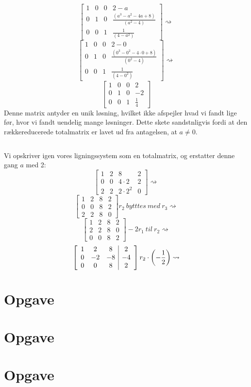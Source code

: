 \documentclass[a4paper,12pt]{article}
\begin{document}
\[
\left[\begin{array}{ccc|c}
    1 & 0 & 0 & 2-a \\
    0 & 1 & 0 & \frac{(a^3 - a^2 - 4a + 8)}{(a^2 - 4)} \\
    0 & 0 & 1 & \frac{1}{(4-a^2)}
\end{array}\right]
\rightsquigarrow
\]
\[
\left[\begin{array}{ccc|c}
    1 & 0 & 0 & 2-0 \\
    0 & 1 & 0 & \frac{(0^3 - 0^2 - 4\cdot0 + 8)}{(0^2 - 4)} \\
    0 & 0 & 1 & \frac{1}{(4-0^2)}
\end{array}\right]
\rightsquigarrow
\]
\[
\left[\begin{array}{ccc|c}
    1 & 0 & 0 & 2 \\
    0 & 1 & 0 & -2 \\
    0 & 0 & 1 & \frac{1}{4}
\end{array}\right]
\]
Denne matrix antyder en unik løsning, hvilket ikke afspejler hvad vi fandt lige før, hvor vi fandt uendelig mange løsninger. Dette skete sandstnligvis fordi at den rækkereducerede totalmatrix er lavet ud fra antagelsen, at $a \neq 0$.

\subsection{}
Vi opskriver igen vores ligningssystem som en totalmatrix, og erstatter denne gang $a$ med 2:
\[
\left[\begin{array}{ccc|c}
    1 & 2 & 8 & 2 \\
    0 & 0 & 4\cdot2 & 2 \\
    2 & 2 & 2\cdot2^2 & 0
\end{array}\right]
\rightsquigarrow
\]
\[
\left[\begin{array}{ccc|c}
    1 & 2 & 8 & 2 \\
    0 & 0 & 8 & 2 \\
    2 & 2 & 8 & 0
\end{array}\right]
r_2 \ bytttes \ med \ r_3
\rightsquigarrow
\]
\[
\left[\begin{array}{ccc|c}
    1 & 2 & 8 & 2 \\
    2 & 2 & 8 & 0 \\
    0 & 0 & 8 & 2
\end{array}\right]
-2r_1 \ til \ r_2
\rightsquigarrow
\]
\[
\left[\begin{array}{ccc|c}
    1 & 2 & 8 & 2 \\
    0 & -2 & -8 & -4 \\
    0 & 0 & 8 & 2
\end{array}\right]
r_2 \cdot \left( -\dfrac{1}{2}\right)
\rightsquigarrow
\]



\section[Opgave]{Opgave}

\section[Opgave]{Opgave}

\section[Opgave]{Opgave}
\end{document}
